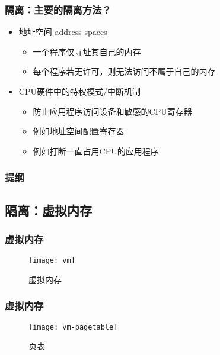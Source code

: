 \begin{frame}
	\frametitle{隔离：\small{主要的隔离方法？}}
		\begin{itemize}
			\item 地址空间 address spaces
				\begin{itemize}
				\item 一个程序仅寻址其自己的内存
				\item 每个程序若无许可，则无法访问不属于自己的内存
				\end{itemize}			
				\pause
			
			\item CPU硬件中的特权模式/中断机制
				\begin{itemize}
				\item 防止应用程序访问设备和敏感的CPU寄存器
				\item 例如地址空间配置寄存器
				\item 例如打断一直占用CPU的应用程序
				\end{itemize}				
		\end{itemize}
\end{frame}

\begin{frame}
    \frametitle{提纲} 
    \tableofcontents 
\end{frame}

\subsection{隔离：虚拟内存}

\begin{frame}[plain]
	
	\frametitle{虚拟内存}
	
	\begin{figure}
		\centering
		\texttt{[image: vm]}
		\caption{虚拟内存}
	\end{figure}
	
\end{frame}

\begin{frame}[plain]
	
	\frametitle{虚拟内存}
	
	\begin{figure}
		\centering
		\texttt{[image: vm-pagetable]}
		\caption{页表}
	\end{figure}
	
\end{frame}

